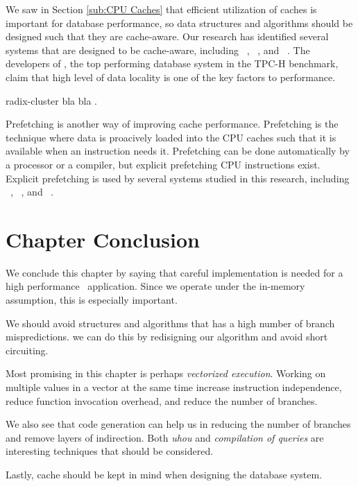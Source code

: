 We saw in Section \ref{sub:CPU Caches} that efficient utilization of caches is important for database performance, so data structures and algorithms should be designed such that they are cache-aware. Our research has identified several systems that are designed to be cache-aware, including \monetdb~\cite{Boncz2002-yq}, \mssql~\cite{Lahiri2015-mz}, and \ibm~\cite{Raman2013-em}. The developers of \exasol, the top performing database system in the TPC-H benchmark, claim that high level of data locality is one of the key factors to performance.

radix-cluster bla bla .

Prefetching is another way of improving cache performance. Prefetching is the technique where data is proacively loaded into the CPU caches such that it is available when an instruction needs it. Prefetching can be done automatically by a processor or a compiler, but explicit prefetching CPU instructions exist. Explicit prefetching is used by several systems studied in this research, including \ibm~\cite{Raman2013-em}, \monetx~\cite{Boncz2005-wj}, and \exasol~\cite{Exasol2014-xh}.

\section{Chapter Conclusion}
\label{sec:Chapter Conclusion}
We conclude this chapter by saying that careful implementation is needed for a high performance \bd~application. Since we operate under the in-memory assumption, this is especially important.

We should avoid structures and algorithms that has a high number of branch mispredictions. we can do this by redisigning our algorithm and avoid short circuiting.

Most promising in this chapter is perhaps \textit{vectorized execution}. Working on multiple values in a vector at the same time increase instruction independence, reduce function invocation overhead, and reduce the number of branches.

We also see that code generation can help us in reducing the number of branches and remove layers of indirection. Both \textit{uhou} and \textit{compilation of queries} are interesting techniques that should be considered.

Lastly, cache should be kept in mind when designing the database system. 
